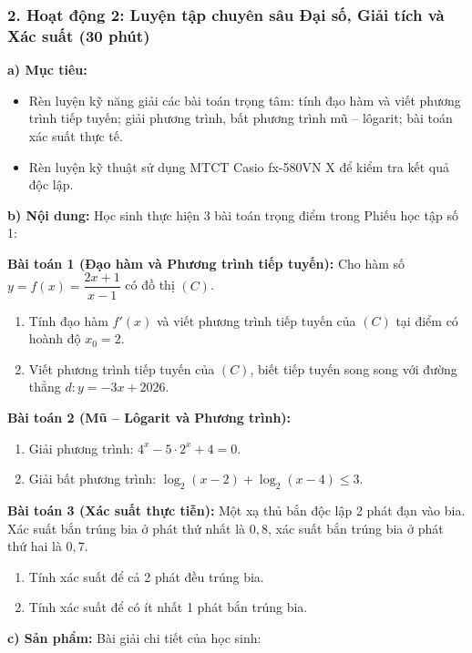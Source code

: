 \documentclass[12pt, a4paper]{article}
\begin{document}
\subsubsection*{2. Hoạt động 2: Luyện tập chuyên sâu Đại số, Giải tích và Xác suất (30 phút)}

\noindent \textbf{a) Mục tiêu:}
\begin{itemize}[leftmargin=0.6cm]
    \item Rèn luyện kỹ năng giải các bài toán trọng tâm: tính đạo hàm và viết phương trình tiếp tuyến; giải phương trình, bất phương trình mũ -- lôgarit; bài toán xác suất thực tế.
    \item Rèn luyện kỹ thuật sử dụng MTCT Casio fx-580VN X để kiểm tra kết quả độc lập.
\end{itemize}

\noindent \textbf{b) Nội dung:}
Học sinh thực hiện 3 bài toán trọng điểm trong Phiếu học tập số 1:

\textbf{Bài toán 1 (Đạo hàm và Phương trình tiếp tuyến):}
Cho hàm số $y = f(x) = \dfrac{2x + 1}{x - 1}$ có đồ thị $(C)$.
\begin{enumerate}[label=\alph*)]
    \item Tính đạo hàm $f'(x)$ và viết phương trình tiếp tuyến của $(C)$ tại điểm có hoành độ $x_0 = 2$.
    \item Viết phương trình tiếp tuyến của $(C)$, biết tiếp tuyến song song với đường thẳng $d: y = -3x + 2026$.
\end{enumerate}

\textbf{Bài toán 2 (Mũ -- Lôgarit và Phương trình):}
\begin{enumerate}[label=\alph*)]
    \item Giải phương trình: $4^x - 5 \cdot 2^x + 4 = 0$.
    \item Giải bất phương trình: $\log_2(x - 2) + \log_2(x - 4) \le 3$.
\end{enumerate}

\textbf{Bài toán 3 (Xác suất thực tiễn):}
Một xạ thủ bắn độc lập 2 phát đạn vào bia. Xác suất bắn trúng bia ở phát thứ nhất là $0{,}8$, xác suất bắn trúng bia ở phát thứ hai là $0{,}7$.
\begin{enumerate}[label=\alph*)]
    \item Tính xác suất để cả 2 phát đều trúng bia.
    \item Tính xác suất để có ít nhất 1 phát bắn trúng bia.
\end{enumerate}

\noindent \textbf{c) Sản phẩm:}
Bài giải chi tiết của học sinh:
\end{document}
